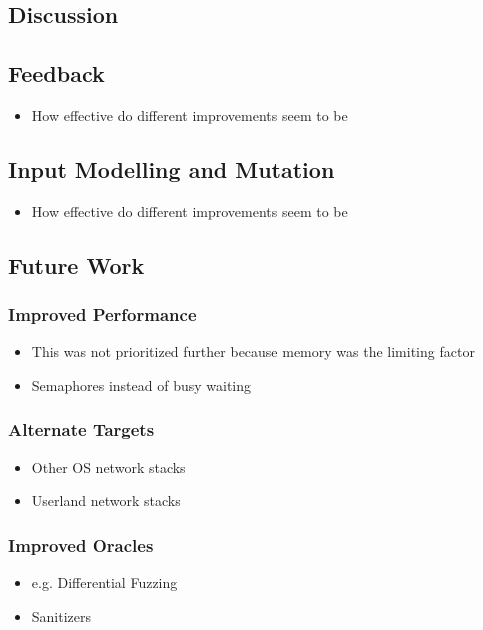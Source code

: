 \documentclass{article}
\begin{document}
\begin{multicols}{2}
  \section{Discussion}

  \subsection{Feedback}
  \begin{itemize}
    \item How effective do different improvements seem to be
  \end{itemize}
  \subsection{Input Modelling and Mutation}
  \begin{itemize}
    \item How effective do different improvements seem to be
  \end{itemize}
  \subsection{Future Work}
  \subsubsection{Improved Performance}
  \begin{itemize}
    \item This was not prioritized further because memory was the limiting factor
    \item Semaphores instead of busy waiting
  \end{itemize}
  \subsubsection{Alternate Targets}
  \begin{itemize}
    \item Other OS network stacks
    \item Userland network stacks
  \end{itemize}
  \subsubsection{Improved Oracles}
  \begin{itemize}
    \item e.g. Differential Fuzzing
    \item Sanitizers
  \end{itemize}

\end{multicols}
\end{document}
